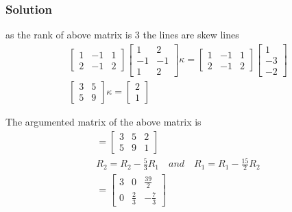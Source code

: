 \documentclass{beamer}
\begin{document}
\begin{frame}
\frametitle{Solution}
as the rank of above matrix is 3 the lines are skew lines
\begin{align}
     \begin{bmatrix}1 & -1 & 1 \\ 2 & -1 & 2\end{bmatrix} \begin{bmatrix}1 & 2 \\ -1 & -1\\1 & 2\end{bmatrix}\kappa =  \begin{bmatrix}1 & -1 & 1 \\ 2 & -1 & 2\end{bmatrix} \begin{bmatrix}1 \\ -3 \\-2\end{bmatrix} \\
  \begin{bmatrix}3 & 5\\5 & 9\end{bmatrix}\kappa =  \begin{bmatrix}2 \\ 1\end{bmatrix}
\end{align}

The argumented matrix of the above matrix is 
\begin{align}
=  \begin{bmatrix}3 & 5 & 2\\5 & 9 & 1\end{bmatrix} \\
 R_2 = R_2 - \frac{5}{3}R_1 \quad and \quad R_1 = R_1 - \frac{15}{2}R_2\\
= \begin{bmatrix}3 & 0 & \frac{39}{2}\\0 & \frac{2}{3} & -\frac{7}{3}\end{bmatrix}
 \end{align}
 \end{frame}
\end{document}
